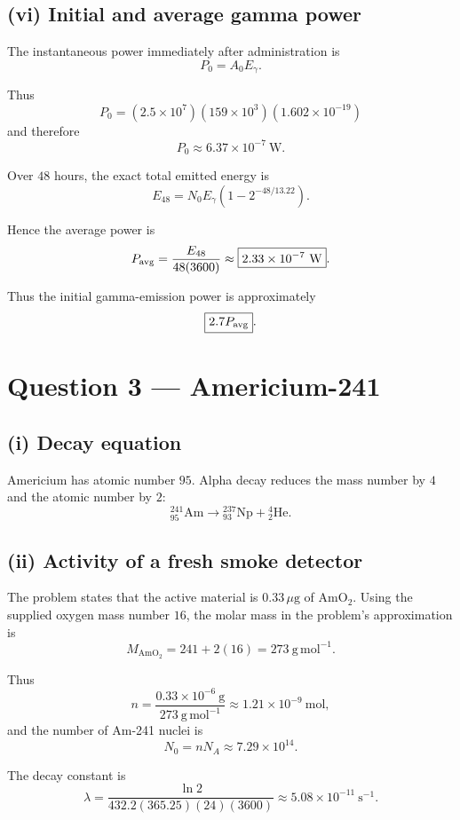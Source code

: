 \documentclass[11pt,a4paper]{article}
\begin{document}
\subsection{(vi) Initial and average gamma power}

The instantaneous power immediately after administration is
\[
P_0=A_0E_\gamma.
\]

Thus
\[
P_0
=
(2.5\times10^7)
(159\times10^3)(1.602\times10^{-19})
\]
and therefore
\[
\boxed{P_0\approx6.37\times10^{-7}\ \mathrm{W}}.
\]

Over $48$ hours, the exact total emitted energy is
\[
E_{48}
=
N_0E_\gamma
\left(1-2^{-48/13.22}\right).
\]

Hence the average power is
\[
P_{\rm avg}
=
\frac{E_{48}}{48(3600)}
\approx
\boxed{2.33\times10^{-7}\ \mathrm W}.
\]

Thus the initial gamma-emission power is approximately
\[
\boxed{2.7P_{\rm avg}}.
\]

\section{Question 3 --- Americium-241}

\subsection{(i) Decay equation}

Americium has atomic number $95$. Alpha decay reduces the mass number by $4$
and the atomic number by $2$:
\[
\boxed{
{}^{241}_{95}\mathrm{Am}
\rightarrow
{}^{237}_{93}\mathrm{Np}
+
{}^{4}_{2}\mathrm{He}
}.
\]

\subsection{(ii) Activity of a fresh smoke detector}

The problem states that the active material is $0.33\,\mu\mathrm g$ of
AmO$_2$. Using the supplied oxygen mass number $16$, the molar mass in the
problem's approximation is
\[
M_{\mathrm{AmO_2}}=241+2(16)=273\ \mathrm{g\,mol^{-1}}.
\]

Thus
\[
n=\frac{0.33\times10^{-6}\ \mathrm g}{273\ \mathrm{g\,mol^{-1}}}
\approx1.21\times10^{-9}\ \mathrm{mol},
\]
and the number of Am-241 nuclei is
\[
N_0=nN_A
\approx
\boxed{7.29\times10^{14}}.
\]

The decay constant is
\[
\lambda
=
\frac{\ln2}{432.2(365.25)(24)(3600)}
\approx5.08\times10^{-11}\ \mathrm{s^{-1}}.
\]
\end{document}
